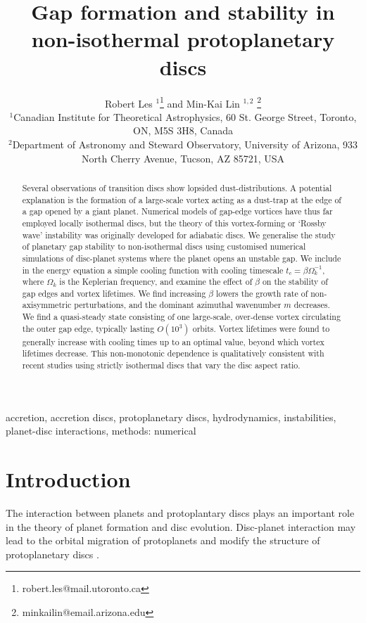 \documentclass[useAMS,usenatbib]{mn2e}
\title[Gaps in non-isothermal discs]{Gap formation and stability in 
  non-isothermal protoplanetary discs}
\author[Les and Lin]{Robert Les
  $^1$\thanks{robert.les@mail.utoronto.ca} and Min-Kai Lin $^{1,2}$
  \thanks{ minkailin@email.arizona.edu} \\ 
  $^1$Canadian Institute for Theoretical Astrophysics,  
  60 St. George Street, Toronto, ON, M5S 3H8, Canada \\
  $^2$Department of Astronomy and Steward Observatory, University of
  Arizona, 933 North Cherry Avenue, Tucson, AZ 85721, USA 
}
\begin{document}
\maketitle
\begin{abstract}
  Several observations of transition discs show lopsided
  dust-distributions. A potential explanation is the formation of a
  large-scale vortex acting as a dust-trap at the edge of a gap opened
  by a giant planet. Numerical models of gap-edge vortices have
  thus far employed locally isothermal discs, but the 
  theory of this vortex-forming or `Rossby wave' instability was
  originally developed for adiabatic discs.  
  We generalise the study of planetary gap stability to non-isothermal
  discs using customised numerical simulations of disc-planet
  systems where the planet opens an unstable gap. 
  We include in the energy equation a simple cooling function with
  cooling timescale $t_c=\beta\Omega_k^{-1}$, where $\Omega_k$ is
  the Keplerian frequency, and examine the effect of $\beta$ on the
  stability of gap edges and vortex lifetimes. We find increasing
  $\beta$ lowers the growth rate of non-axisymmetric perturbations, and the
  dominant azimuthal wavenumber $m$ decreases.  
  We find a quasi-steady state consisting of one  
  large-scale, over-dense vortex circulating the outer gap edge, typically  
  lasting $O(10^3)$ orbits. 
  Vortex lifetimes were found to generally increase with cooling times up to an
  optimal value, beyond which vortex lifetimes decrease. This
  non-monotonic dependence is qualitatively consistent with 
  recent studies using strictly isothermal discs that vary the disc aspect ratio. 
\end{abstract}

\begin{keywords}
  accretion, accretion discs, protoplanetary discs, hydrodynamics, instabilities,
  planet-disc interactions, methods: numerical 
\end{keywords}


\section{Introduction}\label{intro}
The interaction between planets and protoplantary discs plays an
important role in the theory of planet formation and disc 
evolution. Disc-planet interaction may lead to the orbital migration
of protoplanets and modify the structure of
protoplanetary discs  \citep[see][for a recent review]{baruteau13}.  
\end{document}
